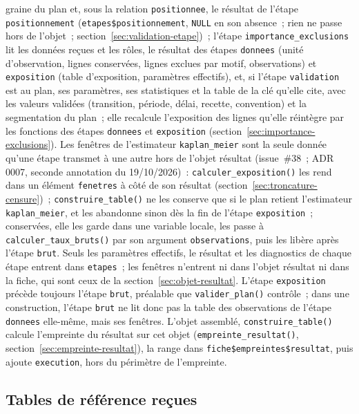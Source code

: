 \documentclass[a4paper,11pt]{article}
\newcommand{\code}[1]{\texttt{\small #1}}
\begin{document}
{graine du plan et, sous la relation \code{positionnee}, le résultat de
l'étape \code{positionnement} (\code{etapes\$positionnement}, \code{NULL}
en son absence~; rien ne passe hors de l'objet~;
section~\ref{sec:validation-etape})~; l'étape
\code{importance\_exclusions} lit les données reçues et les rôles, le
résultat des étapes \code{donnees} (unité d'observation, lignes conservées,
lignes exclues par motif, observations) et \code{exposition} (table
d'exposition, paramètres effectifs), et, si l'étape \code{validation} est au
plan, ses paramètres, ses statistiques et la table de la clé qu'elle cite,
avec les valeurs validées (transition, période, délai, recette, convention)
et la segmentation du plan~; elle
recalcule l'exposition des lignes qu'elle réintègre par les fonctions des
étapes \code{donnees} et \code{exposition}
(section~\ref{sec:importance-exclusions}). Les fenêtres de l'estimateur
\code{kaplan\_meier} sont la seule donnée qu'une étape
transmet à une autre hors de l'objet résultat (issue~\#38~; ADR 0007, seconde
annotation du 19/10/2026)~: \code{calculer\_exposition()} les rend dans un
élément \code{fenetres} à côté de son résultat
(section~\ref{sec:troncature-censure})~; \code{construire\_table()} ne les
conserve que si le plan retient l'estimateur \code{kaplan\_meier}, et les
abandonne sinon dès la fin de l'étape \code{exposition}~; conservées, elle les
garde dans une variable locale, les passe à \code{calculer\_taux\_bruts()}
par son argument \code{observations}, puis les libère après l'étape
\code{brut}. Seuls
les paramètres effectifs, le résultat et les diagnostics de chaque étape
entrent dans \code{etapes}~; les fenêtres n'entrent ni dans l'objet résultat
ni dans la fiche, qui sont ceux de la section~\ref{sec:objet-resultat}.
L'étape \code{exposition} précède toujours l'étape \code{brut}, préalable que
\code{valider\_plan()} contrôle~; dans une construction, l'étape \code{brut}
ne lit donc pas la table des observations de l'étape \code{donnees}
elle-même, mais ses fenêtres. L'objet assemblé, \code{construire\_table()}
calcule l'empreinte du résultat sur cet objet (\code{empreinte\_resultat()},
section~\ref{sec:empreinte-resultat}), la range dans
\code{fiche\$empreintes\$resultat}, puis ajoute \code{execution}, hors du
périmètre de l'empreinte.\par}

\subsection{Tables de référence reçues}
\label{sec:tables-reference-recues}
\begingroup\sloppy
\end{document}
